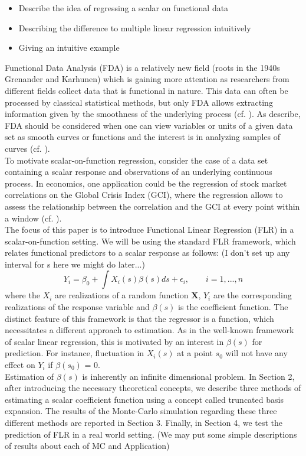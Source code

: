 \documentclass[11pt,twoside,a4paper]{article}
\begin{document}
	\begin{itemize}
		\item Describe the idea of regressing a scalar on functional data
		\item Describing the difference to multiple linear regression intuitively
		\item Giving an intuitive example
	\end{itemize}	
	Functional Data Analysis (FDA) is a relatively new field {\color{red} (roots in the 1940s Grenander and Karhunen)} which is gaining more attention as researchers from different fields collect data that is functional in nature. This data can often be processed by classical statistical methods, but only FDA allows extracting information given by the smoothness of the underlying process (cf. \cite{levitin_introduction_2007}).
	 As \cite{kokoszka_introduction_2017} describe, FDA should be considered when one can view variables or units of a given data set as smooth curves or functions and the interest is in analyzing samples of curves (cf. \cite[S.~17]{kokoszka_introduction_2017}).\\
	 To motivate scalar-on-function regression, consider the case of a data set containing a scalar response and observations of an underlying continuous process. In economics, one application could be the regression of stock market correlations on the Global Crisis Index (GCI), where the regression allows to assess the relationship between the correlation and the GCI at every point within a window (cf. \cite{Das_2019}).\\
	 The focus of this paper is to introduce Functional Linear Regression (FLR) in a scalar-on-function setting. We will be using the standard FLR framework, which relates functional predictors to a scalar response as follows:  {\color{red} (I don't set up any interval for s here we might do later...)}
	 \begin{equation}
	 	Y_{i} = \beta_{0} + \int{X_{i}(s)\beta(s)ds} + \epsilon_{i},
	 	\qquad i = 1, ..., n
	 \end{equation}
	 where the $X_{i}$ are realizations of a random function $\mathbf{X}$, $Y_i$ are the corresponding realizations of the response variable and $\beta(s)$ is the coefficient function. The distinct feature of this framework is that the regressor is a function, which necessitates a different approach to estimation. As in the well-known framework of scalar linear regression, this is motivated by an interest in $\beta(s)$ for prediction. For instance, fluctuation in $X_i(s)$ at a point $s_0$ will not have any effect on $Y_i$ if $\beta(s_0)$ = 0. \\
	 Estimation of $\beta(s)$ is inherently an infinite dimensional problem. In Section 2, after introducing the necessary theoretical concepts, we describe three methods of estimating a scalar coefficient function using a concept called truncated basis expansion. The results of the Monte-Carlo simulation regarding these three different methods are reported in Section 3. Finally, in Section 4, we test the prediction of FLR in a real world setting. {\color{red} (We may put some simple descriptions of results about each of MC and Application)}
\end{document}
